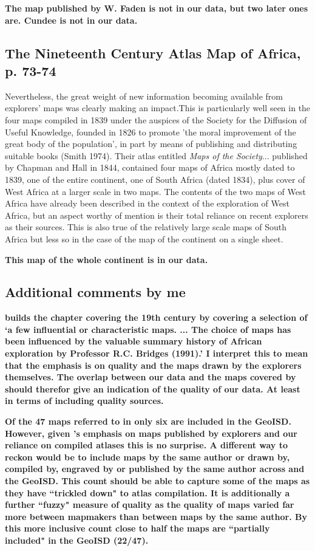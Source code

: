 \documentclass[12pt]{article}
\begin{document}
\textbf{The map published by W. Faden is not in our data, but two later ones
are. Cundee is not in our data.}

\subsection{The Nineteenth Century Atlas Map of Africa, p. 73-74}

Nevertheless, the great weight of new information becoming available from
explorers' maps was clearly making an impact.This is particularly well seen in
the four maps compiled in 1839 under the auspices of the Society for the
Diffusion of Useful Knowledge, founded in 1826 to promote 'the moral improvement
of the great body of the population', in part by means of publishing and
distributing suitable books (Smith 1974). Their atlas entitled \textit{Maps of
the Society}... published by Chapman and Hall in 1844, contained four maps of
Africa mostly dated to 1839, one of the entire continent, one of South Africa
(dated 1834), plus cover of West Africa at a larger scale in two maps. The
contents of the two maps of West Africa have already been described in the
context of the exploration of West Africa, but an aspect worthy of mention is
their total reliance on recent explorers as their sources. This is also true of
the relatively large scale maps of South Africa but less so in the case of the
map of the continent on a single sheet.

\textbf{This map of the whole continent is in our data.}

\subsection{Additional comments by me}

\textbf{\citet{Stone1995} builds the chapter covering the 19th century by
	covering a selection of `a few influential or characteristic maps. ...
	The choice of maps has been influenced by the valuable summary history
	of African exploration by Professor R.C. Bridges (1991).' I interpret
	this to mean that the emphasis is on quality and the maps drawn by the
	explorers themselves.  The overlap between our data and the maps covered
	by \citet{Stone1995} should therefor give an indication of the quality
	of our data.  At least in terms of including quality sources.}

\textbf{Of the 47 maps referred to in \citet{Stone1995} only six are included in
	the GeoISD. However, given \citet{Stone1995}'s emphasis on maps
	published by explorers and our reliance on compiled atlases this is no
	surprise. A different way to reckon would be to include maps by the same
	author or drawn by, compiled by, engraved by or published by the same
	author across \citet{Stone1995} and the GeoISD. This count should be
	able to capture some of the maps as they have ``trickled down" to atlas
	compilation. It is additionally a further ``fuzzy" measure of quality as
the quality of maps varied far more between mapmakers than between maps by the
same author. By this more inclusive count close to half the maps are ``partially
included" in the GeoISD (22/47).}
	
\end{document}
